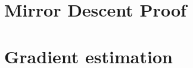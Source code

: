 
\section{Mirror Descent Proof}
\label{sec:appendix-md}


\section{Gradient estimation}
\label{sec:appendix-grad}



